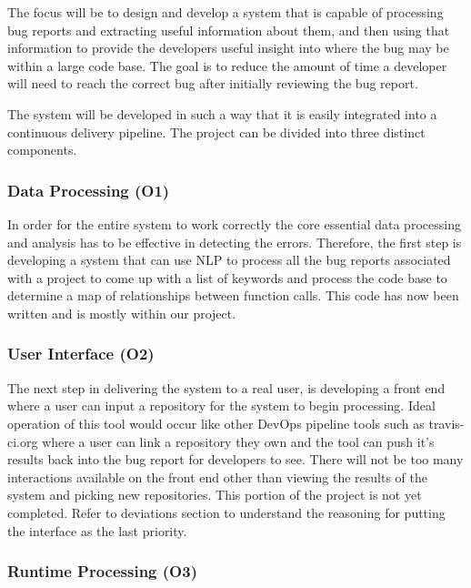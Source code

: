 \documentclass[12pt]{article}
\begin{document}
The focus will be to design and develop a system that is capable of
processing bug reports and extracting useful information about them, and
then using that information to provide the developers useful insight
into where the bug may be within a large code base. The goal is to
reduce the amount of time a developer will need to reach the correct bug
after initially reviewing the bug report.

The system will be developed in such a way that it is easily integrated
into a continuous delivery pipeline. The project can be divided into
three distinct components.

\hypertarget{data-processing-o1}{%
\subsubsection{Data Processing (O1)}\label{data-processing-o1}}

In order for the entire system to work correctly the core essential data
processing and analysis has to be effective in detecting the errors.
Therefore, the first step is developing a system that can use NLP to
process all the bug reports associated with a project to come up with a
list of keywords and process the code base to determine a map of
relationships between function calls. This code has now been written and
is mostly within our project.

\hypertarget{user-interface-o2}{%
\subsubsection{User Interface (O2)}\label{user-interface-o2}}

The next step in delivering the system to a real user, is developing a
front end where a user can input a repository for the system to begin
processing. Ideal operation of this tool would occur like other DevOps
pipeline tools such as travis-ci.org where a user can link a repository
they own and the tool can push it's results back into the bug report for
developers to see. There will not be too many interactions available on
the front end other than viewing the results of the system and picking
new repositories. This portion of the project is not yet completed.
Refer to deviations section to understand the reasoning for putting the
interface as the last priority.

\hypertarget{runtime-processing-o3}{%
\subsubsection{Runtime Processing (O3)}\label{runtime-processing-o3}}
\end{document}
